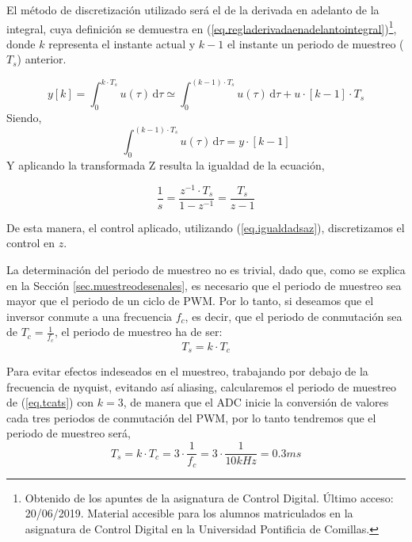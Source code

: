 \documentclass{report}
\begin{document}
El método de discretización utilizado será el de la derivada en adelanto de la integral, cuya definición se demuestra en  (\ref{eq.regladerivadaenadelantointegral})\footnote{Obtenido de los apuntes de la asignatura de Control Digital. Último acceso: 20/06/2019. Material accesible para los alumnos matriculados en la asignatura de Control Digital en la Universidad Pontificia de Comillas.\label{note1}}, donde $k$ representa el instante actual y $k-1$ el instante un periodo de muestreo ($T_{s}$) anterior.

\begin{equation}
    y[k] = \int_{0}^{k\cdot T_{s}} u(\tau) \,\mathrm{d}\tau \simeq \int_{0}^{(k-1)\cdot T_{s}} u(\tau) \,\mathrm{d}\tau + u\cdot[k-1]\cdot T_{s} \label{eq.regladerivadaenadelantointegral}
\end{equation}
Siendo,
\begin{equation}
    \int_{0}^{(k-1)\cdot T_{s}} u(\tau) \,\mathrm{d}\tau = y \cdot [k-1]
\end{equation}
Y aplicando la transformada Z resulta la igualdad de la ecuación,

\begin{equation}
    \frac{1}{s}=\frac{z^{-1}\cdot T_{s}}{1-z^{-1}} = \frac{T_{s}}{z-1} \label{eq.igualdadsaz}
\end{equation}

De esta manera, el control aplicado, utilizando  (\ref{eq.igualdadsaz}), discretizamos el control en $z$. 

La determinación del periodo de muestreo no es trivial, dado que, como se explica en la Sección \ref{sec.muestreodesenales}, es necesario que el periodo de muestreo sea mayor que el periodo de un ciclo de PWM. Por lo tanto, si deseamos que el inversor conmute a una frecuencia $f_{c}$, es decir, que el periodo de conmutación sea de $T_{c} = \frac{1}{f_{c}}$, el periodo de muestreo ha de ser:
\begin{equation}
    T_{s} = k \cdot T_{c} \label{eq.tcats}
\end{equation}

Para evitar efectos indeseados en el muestreo, trabajando por debajo de la frecuencia de nyquist, evitando así aliasing, calcularemos el periodo de muestreo de  (\ref{eq.tcats}) con $k = 3$, de manera que el ADC inicie la conversión de valores cada tres periodos de conmutación del PWM, por lo tanto tendremos que el periodo de muestreo será,
\begin{equation}
    T_{s} = k \cdot T_{c} = 3 \cdot \frac{1}{f_{c}} = 3\cdot\frac{1}{10kHz} = 0.3 ms    \label{eq.valorts}
\end{equation}
\end{document}
